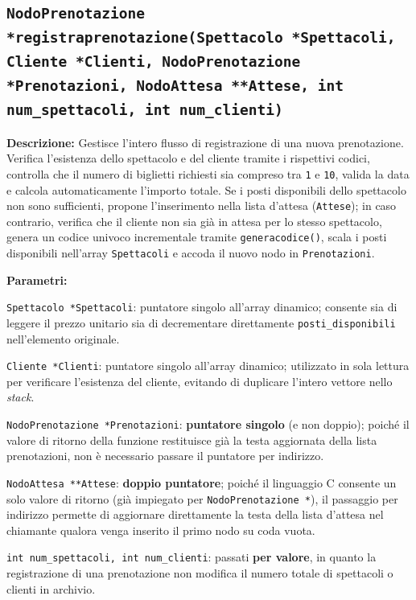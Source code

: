 \documentclass[11pt,a4paper,oneside,openany]{book}
\newenvironment{listacomp}{%
    \small
    \begin{list}{\textendash}{%
        \setlength{\topsep}{2pt}%
        \setlength{\partopsep}{0pt}%
        \setlength{\itemsep}{1pt}%
        \setlength{\parsep}{0pt}%
        \setlength{\leftmargin}{1.2em}%
    }%
}{%
    \end{list}%
}
\begin{document}
\subsection[registraprenotazione()]{\texttt{NodoPrenotazione *registraprenotazione(Spettacolo *Spettacoli, Cliente *Clienti, NodoPrenotazione *Prenotazioni, NodoAttesa **Attese, int num\_spettacoli, int num\_clienti)}}

\noindent\textbf{Descrizione:}
Gestisce l'intero flusso di registrazione di una nuova prenotazione. Verifica l'esistenza dello spettacolo e del cliente tramite i rispettivi codici, controlla che il numero di biglietti richiesti sia compreso tra \texttt{1} e \texttt{10}, valida la data e calcola automaticamente l'importo totale. Se i posti disponibili dello spettacolo non sono sufficienti, propone l'inserimento nella lista d'attesa (\texttt{Attese}); in caso contrario, verifica che il cliente non sia già in attesa per lo stesso spettacolo, genera un codice univoco incrementale tramite \texttt{generacodice()}, scala i posti disponibili nell'array \texttt{Spettacoli} e accoda il nuovo nodo in \texttt{Prenotazioni}.

\noindent\textbf{Parametri:}
\begin{listacomp}
    \item \texttt{Spettacolo *Spettacoli}: puntatore singolo all'array dinamico; consente sia di leggere il prezzo unitario sia di decrementare direttamente \texttt{posti\_disponibili} nell'elemento originale.
    \item \texttt{Cliente *Clienti}: puntatore singolo all'array dinamico; utilizzato in sola lettura per verificare l'esistenza del cliente, evitando di duplicare l'intero vettore nello \emph{stack}.
    \item \texttt{NodoPrenotazione *Prenotazioni}: \textbf{puntatore singolo} (e non doppio); poiché il valore di ritorno della funzione restituisce già la testa aggiornata della lista prenotazioni, non è necessario passare il puntatore per indirizzo.
    \item \texttt{NodoAttesa **Attese}: \textbf{doppio puntatore}; poiché il linguaggio C consente un solo valore di ritorno (già impiegato per \texttt{NodoPrenotazione *}), il passaggio per indirizzo permette di aggiornare direttamente la testa della lista d'attesa nel chiamante qualora venga inserito il primo nodo su coda vuota.
    \item \texttt{int num\_spettacoli, int num\_clienti}: passati \textbf{per valore}, in quanto la registrazione di una prenotazione non modifica il numero totale di spettacoli o clienti in archivio.
\end{listacomp}
\end{document}
